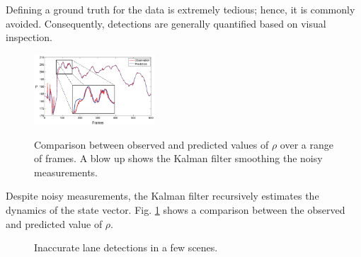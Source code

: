 \documentclass{article}
\begin{document}
Defining a ground truth for the data is extremely tedious; hence, it is commonly avoided. Consequently, detections are generally quantified based on visual inspection.
\begin{figure}[htb!]
  \centering
  \includegraphics[width=0.4\textwidth]{IMG/obs_pred_rho.png}\\
  \caption{Comparison between observed and predicted values of $\rho$ over a range of frames. A blow up shows the Kalman filter smoothing the noisy measurements.}
  \label{fig:obs_pred_kalman}
\end{figure}
Despite noisy measurements, the Kalman filter recursively estimates the dynamics of the state vector. Fig. \ref{fig:obs_pred_kalman} shows a comparison between the observed and predicted value of $\rho$.
\begin{figure}[htb!]
  \centering
  \hspace{0.00001in}
  \caption{Inaccurate lane detections in a few scenes.}
  \label{fig:lane_detection_wrong}
\end{figure}
\end{document}

